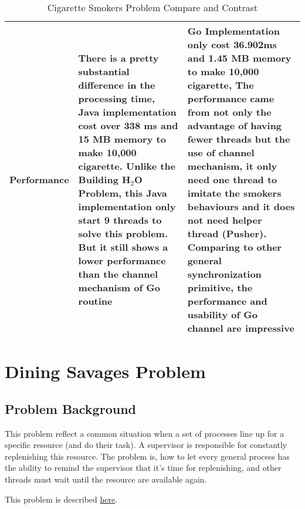 \documentclass[a4paper,10pt]{article}
\begin{document}
{\begin{table}[!htbp]
\begin{adjustwidth}{-3cm}{}
{\begin{tabular}{|p{2.7cm}|p{5.7cm}|p{5.7cm}|}
        \textbf{Performance} & There is a pretty substantial difference in the processing time, Java implementation cost over 338 ms  and 15 MB memory to make 10,000 cigarette. Unlike the Building H$_2$O Problem, this Java implementation only start 9 threads to solve this problem. But it still shows a lower performance than the channel mechanism of Go routine & Go Implementation only cost 36.902ms and 1.45 MB memory to make 10,000 cigarette, The performance came from not only the advantage of having fewer threads but the use of channel mechanism, it only need one thread to imitate the smokers behaviours and it does not need helper thread (Pusher). Comparing to other general synchronization primitive, the performance and usability of Go channel are impressive \\ \hline 
    \end{tabular}}
    \end{adjustwidth}
    \caption{Cigarette Smokers Problem Compare and Contrast}
\end{table}
}%


\newpage
\section{Dining Savages Problem}
\subsection{Problem Background}
This problem reflect a common situation when a set of processes line up for a specific resource (and do their task). A supervisor is responsible for constantly replenishing this resource. The problem is, how to let every general process has the ability to remind the supervisor that it's time for replenishing, and other threads must wait until the resource are available again.

This problem is described \href{http://greenteapress.com/semaphores/LittleBookOfSemaphores.pdf#section.5.1}{here}.
\end{document}

